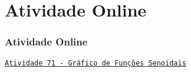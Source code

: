 \section{Atividade Online}
\begin{frame}
\frametitle{Atividade Online} 

\href{https://pt.khanacademy.org/math/trigonometry/trig-function-graphs/graphing-sinusoids/e/graphs_of_sine_and_cosine}
{{\tt Atividade 71 - Gráfico de Funções Senoidais}}





\end{frame}
